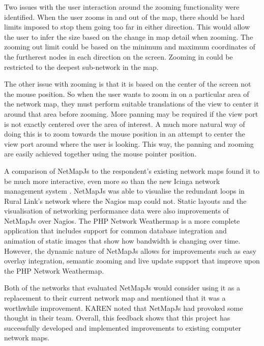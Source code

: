 \documentclass[11pt, a4paper]{report}
\begin{document}
Two issues with the user interaction around the zooming functionality were
identified. When the user zooms in and out of the map, there should be hard
limits imposed to stop them going too far in either direction. This would allow
the user to infer the size based on the change in map detail when zooming. The
zooming out limit could be based on the minimum and maximum coordinates of the
furtherest nodes in each direction on the screen. Zooming in could be restricted
to the deepest sub-network in the map.

The other issue with zooming is that it is based on the center of the screen not
the mouse position. So when the user wants to zoom in on a particular area of
the network map, they must perform suitable translations of the view to center
it around that area before zooming. More panning may be required if the view
port is not exactly centered over the area of interest. A much more natural way
of doing this is to zoom towards the mouse position in an attempt to center the
view port around where the user is looking. This way, the panning and zooming
are easily achieved together using the mouse pointer position.

A comparison of NetMapJs to the respondent's existing network maps found it to
be much more interactive, even more so than the new Icinga network management
system \cite{Icinga_website}. NetMapJs was able to visualise the redundant loops
in Rural Link's network where the Nagios map could not. Static layouts and the
visualisation of networking performance data were also improvements of NetMapJs
over Nagios. The PHP Network Weathermap is a more complete application that
includes support for common database integration and animation of static images
that show how bandwidth is changing over time. However, the dynamic nature of
NetMapJs allows for improvements such as easy overlay integration, semantic
zooming and live update support that improve upon the PHP Network Weathermap.

Both of the networks that evaluated NetMapJs would consider using it as a
replacement to their current network map and mentioned that it was a worthwhile
improvement. KAREN noted that NetMapJs had provoked some thought in their team.
Overall, this feedback shows that this project has successfully developed and
implemented improvements to existing computer network maps.
\end{document}
